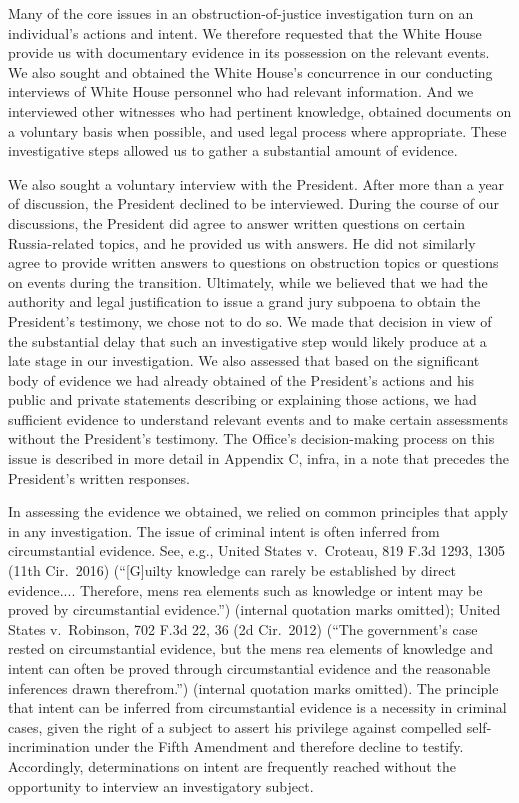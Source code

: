 Many of the core issues in an obstruction-of-justice investigation turn on an individual’s actions and intent.
We therefore requested that the White House provide us with documentary evidence in its possession on the relevant events.
We also sought and obtained the White House’s concurrence in our conducting interviews of White House personnel who had relevant information.
And we interviewed other witnesses who had pertinent knowledge, obtained documents on a voluntary basis when possible, and used legal process where appropriate.
These investigative steps allowed us to gather a substantial amount of evidence.

We also sought a voluntary interview with the President.
After more than a year of discussion, the President declined to be interviewed.
During the course of our discussions, the President did agree to answer written questions on certain Russia-related topics, and he provided us with answers.
He did not similarly agree to provide written answers to questions on obstruction topics or questions on events during the transition.
Ultimately, while we believed that we had the authority and legal justification to issue a grand jury subpoena to obtain the President’s testimony, we chose not to do so.
We made that decision in view of the substantial delay that such an investigative step would likely produce at a late stage in our investigation.
We also assessed that based on the significant body of evidence we had already obtained of the President’s actions and his public and private statements describing or explaining those actions, we had sufficient evidence to understand relevant events and to make certain assessments without the President’s testimony.
The Office’s decision-making process on this issue is described in more detail in Appendix C, infra, in a note that precedes the President’s written responses.

In assessing the evidence we obtained, we relied on common principles that apply in any investigation.
The issue of criminal intent is often inferred from circumstantial evidence.
See, e.g., United States v.\ Croteau, 819 F.3d 1293, 1305 (11th Cir.~2016) (“[G]uilty knowledge can rarely be established by direct evidence....
Therefore, mens rea elements such as knowledge or intent may be proved by circumstantial evidence.”) (internal quotation marks omitted);
United States v.\ Robinson, 702 F.3d 22, 36 (2d Cir.~2012) (“The government’s case rested on circumstantial evidence, but the mens rea elements of knowledge and intent can often be proved through circumstantial evidence and the reasonable inferences drawn therefrom.”) (internal quotation marks omitted).
The principle that intent can be inferred from circumstantial evidence is a necessity in criminal cases, given the right of a subject to assert his privilege against compelled self-incrimination under the Fifth Amendment and therefore decline to testify.
Accordingly, determinations on intent are frequently reached without the opportunity to interview an investigatory subject.

